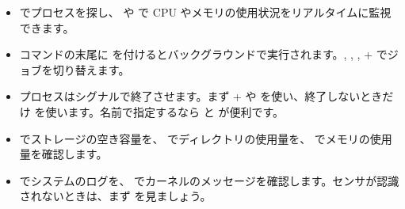 \begin{itemize}
  \item {} でプロセスを探し、 や  で CPU やメモリの使用状況をリアルタイムに監視できます。
  \item コマンドの末尾に \cmd{\&} を付けるとバックグラウンドで実行されます。, , , + でジョブを切り替えます。
  \item プロセスはシグナルで終了させます。まず + や  を使い、終了しないときだけ  を使います。名前で指定するなら  と  が便利です。
  \item {} でストレージの空き容量を、 でディレクトリの使用量を、 でメモリの使用量を確認します。
  \item {} でシステムのログを、 でカーネルのメッセージを確認します。センサが認識されないときは、まず  を見ましょう。
\end{itemize}
